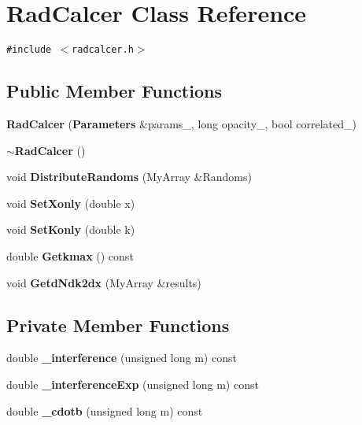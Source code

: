 \section{RadCalcer Class Reference}
\label{classRadCalcer}
{\tt \#include $<$radcalcer.h$>$}

\subsection*{Public Member Functions}
\begin{CompactItemize}
\item 
{\bf RadCalcer} ({\bf Parameters} \&params\_\-, long opacity\_\-, bool correlated\_\-)
\item 
{\bf $\sim$RadCalcer} ()
\item 
void {\bf DistributeRandoms} (MyArray \&Randoms)
\item 
void {\bf SetXonly} (double x)
\item 
void {\bf SetKonly} (double k)
\item 
double {\bf Getkmax} () const 
\item 
void {\bf GetdNdk2dx} (MyArray \&results)
\end{CompactItemize}
\subsection*{Private Member Functions}
\begin{CompactItemize}
\item 
double {\bf \_\-interference} (unsigned long m) const 
\item 
double {\bf \_\-interferenceExp} (unsigned long m) const 
\item 
double {\bf \_\-cdotb} (unsigned long m) const 
\end{CompactItemize}
